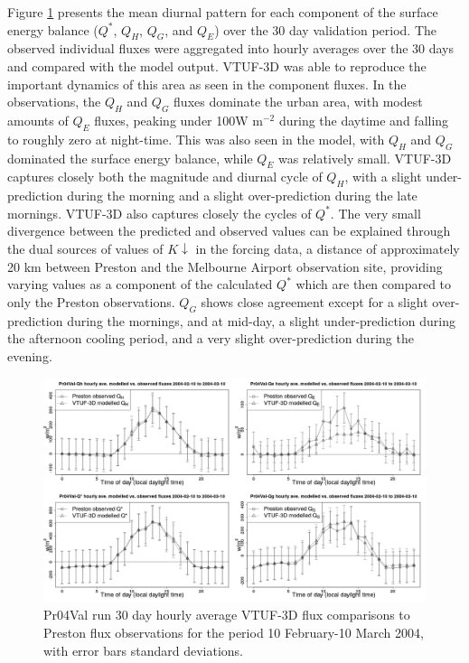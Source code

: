 \documentclass[final,3p,times,authoryear]{elsarticle}
\begin{document}
Figure \ref{fig:Preston30Day4} presents the mean diurnal pattern for each component of the surface energy balance ($Q^{*}$, $Q_{H}$, $Q_{G}$, and $Q_{E}$)  over the 30 day validation period. The observed individual fluxes were aggregated into hourly averages over the 30 days and compared with the model output. VTUF-3D was able to reproduce the important dynamics of this area as seen in the component fluxes. In the observations, the $Q_{H}$ and $Q_{G}$ fluxes dominate the urban area, with modest amounts of $Q_{E}$ fluxes, peaking under 100W m$^{-2}$ during the daytime and falling to roughly zero at night-time. This was also seen in the model, with $Q_{H}$ and $Q_{G}$ dominated the surface energy balance, while $Q_{E}$ was relatively small. VTUF-3D captures closely both the magnitude and diurnal cycle of $Q_{H}$, with a slight under-prediction during the morning and a slight over-prediction during the late mornings. VTUF-3D also captures closely the cycles of $Q^{*}$. The very small divergence between the predicted and observed values can be explained through the dual sources of values of $K\downarrow$ in the forcing data, a distance of approximately 20 km between Preston and the Melbourne Airport observation site, providing varying values as a component of the calculated $Q^{*}$ which are then compared to only the Preston observations. $Q_{G}$ shows close agreement except for a slight over-prediction during the mornings, and at mid-day, a slight under-prediction during the afternoon cooling period, and a very slight over-prediction during the evening. 


\begin{figure}[!htbp] 
\includegraphics[trim = 0mm 0mm 0mm 0mm, clip, scale=0.30]{images/Pr04Val-EnergyBalanceOverallAve4Plots_.png}
\caption{Pr04Val run 30 day hourly average VTUF-3D flux comparisons to Preston flux observations for the period 10 February-10 March 2004, with error bars standard deviations. \label{fig:Preston30Day4} }     
\end{figure}
\end{document}
